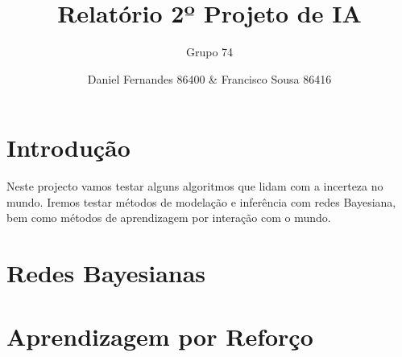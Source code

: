 \documentclass[12pt,a4paper]{article}
\title{Relatório 2º Projeto de IA}
\author{Grupo 74 \and Daniel Fernandes 86400 \& Francisco Sousa 86416}
\begin{document}
\maketitle
\begin{multicols}{2}
	\section{Introdução}
	Neste projecto vamos testar alguns algoritmos que lidam com a incerteza no
	mundo. Iremos testar métodos de modelação e inferência com redes Bayesiana,
	bem como métodos de aprendizagem por interação com o mundo.

	\section{Redes Bayesianas}


	\section{Aprendizagem por Reforço}

	\end{multicols}
\end{document}
